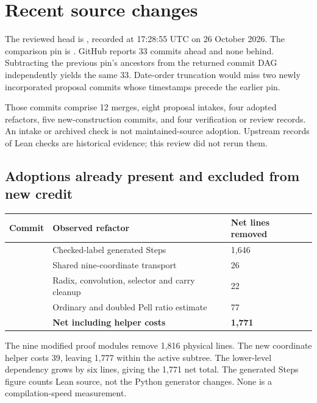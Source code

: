 \section{Recent source changes}

The reviewed head is , recorded at 17:28:55 UTC on 26 October 2026. The comparison pin is . GitHub reports 33 commits ahead and none behind. Subtracting the previous pin's ancestors from the returned commit DAG independently yields the same 33. Date-order truncation would miss two newly incorporated proposal commits whose timestamps precede the earlier pin.

Those commits comprise 12 merges, eight proposal intakes, four adopted refactors, five new-construction commits, and four verification or review records. An intake or archived check is not maintained-source adoption. Upstream records of Lean checks are historical evidence; this review did not rerun them.

\subsection{Adoptions already present and excluded from new credit}
\begin{tabularx}{\linewidth}{@{}L{1.05in}Y R{0.8in}@{}}
\toprule
Commit & Observed refactor & Net lines removed \\
\midrule
{} & Checked-label generated Steps & 1,646 \\
 & Shared nine-coordinate transport & 26 \\
 & Radix, convolution, selector and carry cleanup & 22 \\
 & Ordinary and doubled Pell ratio estimate & 77 \\
\midrule
 & \textbf{Net including helper costs} & \textbf{1,771} \\
\bottomrule
\end{tabularx}

The nine modified proof modules remove 1,816 physical lines. The new coordinate helper costs 39, leaving 1,777 within the active subtree. The lower-level  dependency grows by six lines, giving the 1,771 net total. The generated Steps figure counts Lean source, not the Python generator changes. None is a compilation-speed measurement.

